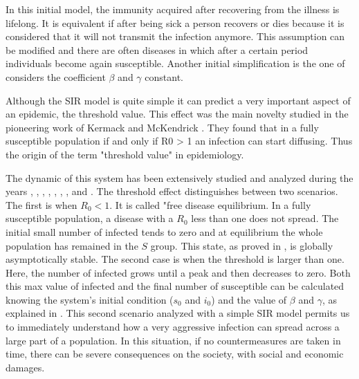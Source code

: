 In this initial model, the immunity acquired after recovering from the illness is lifelong. It is equivalent if after being sick a person recovers or dies because it is considered that it will not transmit the infection anymore.  This assumption can be modified and there are often diseases in which after a certain period individuals become again susceptible. Another initial simplification is the one of considers the coefficient $\beta$ and $\gamma$ constant. 

Although the SIR model is quite simple it can predict a very important aspect of an epidemic, the threshold value. This effect was the main novelty studied in the pioneering work of Kermack and McKendrick \cite{kermack1927}. They found that in a fully susceptible population if and only if R0 > 1 an infection can start diffusing. Thus the origin of the term "threshold value" in epidemiology. 

The dynamic of this system has been extensively studied and analyzed during the years \cite{Breda_2012}, \cite{akinboro2014numerical}, \cite{Jard_n_Kojakhmetov_2021}, \cite{Ledder_2023}, \cite{Okabe_2020}, \cite{Prodanov_2022}, \cite{Xu_2014}, and \cite{Turkyilmazoglu_2021}. The threshold effect distinguishes between two scenarios. The first is when $R_0 <1 $. It is called "free disease equilibrium. 
In a fully susceptible population, a disease with a $R_0$ less than one does not spread. The initial small number of infected tends to zero and at equilibrium the whole population has remained in the $S$ group. This state, as proved in \cite{Hernandez_Vargas_2022}, is globally asymptotically stable. The second case is when the threshold is larger than one. Here, the number of infected grows until a peak and then decreases to zero. Both this max value of infected and the final number of susceptible can be calculated knowing the system's initial condition ($s_0$ and $i_0$) and the value of $\beta$ and $\gamma$, as explained in \cite{Hethcote_2000}. 
This second scenario analyzed with a simple SIR model permits us to immediately understand how a very aggressive infection can spread across a large part of a population. In this situation, if no countermeasures are taken in time, there can be severe consequences on the society, with social and economic damages. 

